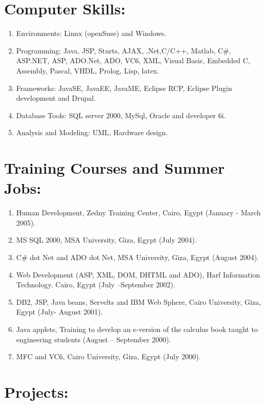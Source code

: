 \documentclass{article}
\begin{document}
 \section*{Computer Skills:}
 \begin{enumerate}
\item Environments: Linux (openSuse) and Windows.
\item Programming: Java, JSP, Sturts, AJAX, .Net,C/C++, Matlab, C\#,  ASP.NET, ASP, ADO.Net, ADO, VC6,  XML,  Visual Basic, Embedded C, Assembly, Pascal, VHDL, Prolog, Lisp,  latex.
 \item Frameworks: JavaSE, JavaEE, JavaME, Eclipse RCP, Eclipse Plugin development and Drupal.
 \item Database Tools: SQL server 2000, MySql, Oracle and developer 6i.
 \item Analysis and Modeling: UML, Hardware design.
\end{enumerate}



 \section*{Training Courses and Summer Jobs:}
 \begin{enumerate}
\item Human Development, Zedny Training Center, Cairo, Egypt (January - March 2005).
 \item MS SQL 2000, MSA University, Giza, Egypt (July 2004).
 \item C\# dot Net and ADO dot Net, MSA University, Giza, Egypt (August 2004).
 \item Web Development (ASP, XML, DOM, DHTML and ADO), Harf Information Technology. Cairo, Egypt (July --September 2002).
 \item DB2, JSP, Java beans, Servelts and IBM Web Sphere, Cairo University, Giza, Egypt (July- August 2001).
 \item Java applets, Training to develop an e-version of the calculus book
 taught to engineering students (August -- September 2000).
 \item MFC and VC6, Cairo University, Giza, Egypt (July 2000).
\end{enumerate}



 \section*{Projects:}
\end{document}
